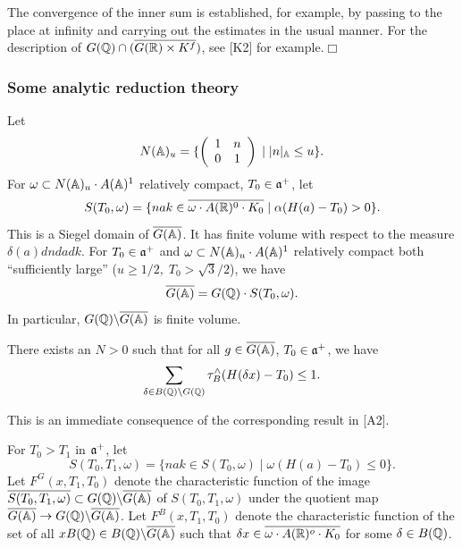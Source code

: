 The convergence of the inner sum is established, for example, by passing to
the place at infinity and carrying out the estimates in the usual manner.
For the description of
$G({\Bbb{Q}})\cap (\overline{G({\Bbb{R}})\times K^f})$,
see [K2] for example.$\Box $

\subsubsection{Some analytic reduction theory}

Let 
\[
N({\Bbb{A}})_u=\{\left( 
\begin{array}{cc}
1 & n \\ 
0 & 1
\end{array}
\right) \;|\;|n|_{{\Bbb{A}}}\leq u\}. 
\]
For $\omega \subset N({\Bbb{A}})_u\cdot A({\Bbb{A}})^1$
relatively compact, $T_0\in {\frak{a}}^{+}$, let 
\[
S(T_0,\omega )=
\{nak\in \overline{\omega \cdot A({\Bbb{R}})^0\cdot K_0}
\;|\;\alpha (H(a)-T_0)>0\}. 
\]
This is a Siegel domain of $\overline{G({\Bbb{A}})}$. It has finite volume
with respect to the measure $\delta (a)dndadk$. For $T_0\in {\frak{a}}^{+}$
and $\omega \subset N({\Bbb{A}})_u\cdot A({\Bbb{A}})^1$ relatively
compact both
``sufficiently large'' ($u\geq 1/2,\;T_0>\sqrt{3}/2$), we have 
\[
\overline{G({\Bbb{A}})}=G({\Bbb{Q}})\cdot S(T_0,\omega ). 
\]
In particular, $G({\Bbb{Q}})\backslash \overline{G({\Bbb{A}})}$ is
finite volume.

\begin{lemma}
There exists an $N>0$ such that for all $g\in \overline{G({\Bbb{A}})}$,
$T_0\in {\frak{a}}^{+}$, we have 
\[
\sum_{\delta \in B({\Bbb{Q}})\backslash G({\Bbb{Q}})}
\tau _B^{\wedge }(H(\delta x)-T_0)\leq 1.
\]
\end{lemma}

This is an immediate consequence of the corresponding result in [A2].

For $T_0>T_1$ in ${\frak{a}}^{+}$, let 
\[
S(T_0,T_1,\omega )=\{nak\in S(T_0,\omega )\;|\;\omega (H(a)-T_0)\leq 0\}. 
\]
Let $F^G(x,T_1,T_0)$ denote the characteristic function of the image
$\overline{S(T_0,T_1,\omega )}\subset
G({\Bbb{Q}})\backslash \overline{G({\Bbb{A}})}$ of
$S(T_0,T_1,\omega )$ under the quotient map
$\overline{G({\Bbb{A}})}\rightarrow
G({\Bbb{Q}})\backslash \overline{G({\Bbb{A}})}$. Let
$F^B(x,T_1,T_0)$
denote the characteristic function of the set of all
$xB({\Bbb{Q}})\in B({\Bbb{Q}})\backslash \overline{G({\Bbb{A}})}$ such
that $\delta x\in \overline{\omega \cdot A({\Bbb{R}})^o\cdot K_0}$
for some $\delta \in B({\Bbb{Q}})$.

